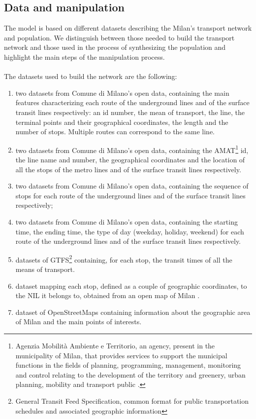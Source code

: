 \subsection{Data and manipulation}\label{sec3}
The model is based on different datasets describing the Milan's transport network and population. We distinguish between those needed to build the transport network and those used in the process of synthesizing the population and highlight the main steps of the manipulation process.\\ \\
The datasets used to build the network are the following:
\begin{enumerate}
    \item two datasets \cite{site1, site5} from Comune di Milano's open data, containing the main features characterizing each route of the underground lines and  of the surface transit lines respectively: an id number, the mean of transport, the line, the terminal points and their geographical coordinates, the length and the number of stops. Multiple routes can correspond to the same line. 
    \item two datasets \cite{site2, site6} from Comune di Milano's open data, containing the AMAT\footnote{Agenzia Mobilità Ambiente e Territorio, an agency, present in the municipality of Milan, that provides services to support the municipal functions in the fields of planning, programming, management, monitoring and control relating to the development of the territory and greenery, urban planning, mobility and transport public \cite{site21}.} id, the line name and number, the geographical coordinates and the location of all the stops of the metro lines and of the surface transit lines respectively.
    \item two datasets \cite{site3, site7} from Comune di Milano's open data, containing the sequence of stops for each route of the underground lines and of the surface transit lines respectively;
    \item two datasets \cite{site4, site8} from Comune di Milano's open data, containing the starting time, the ending time, the type of day (weekday, holiday, weekend) for each route of the underground lines and  of the surface transit lines respectively. 
    \item datasets \cite{site12} of GTFS\footnote{General Transit Feed Specification, common format for public transportation schedules and associated geographic information} containing, for each stop, the transit times of all the means of transport. 
    \item dataset mapping each stop, defined as a couple of geographic coordinates, to the NIL it belongs to, obtained from an open map of Milan \cite{site22}.
    \item dataset of OpenStreetMaps containing information about the geographic area of Milan and the main points of interests.
\end{enumerate} 
